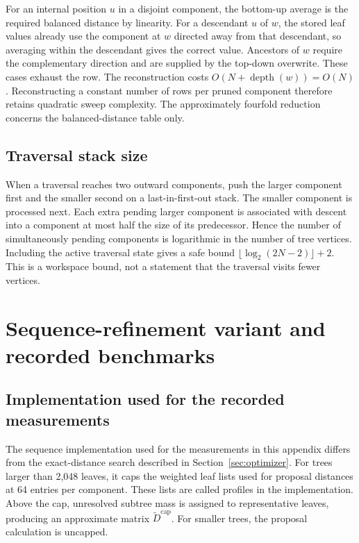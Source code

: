 For an internal position $u$ in a disjoint component, the bottom-up average is the required balanced distance by linearity.
For a descendant $u$ of $w$, the stored leaf values already use the component at $w$ directed away from that descendant, so averaging within the descendant gives the correct value.
Ancestors of $w$ require the complementary direction and are supplied by the top-down overwrite.
These cases exhaust the row.
The reconstruction costs $O(N+\operatorname{depth}(w))=O(N)$.
Reconstructing a constant number of rows per pruned component therefore retains quadratic sweep complexity.
The approximately fourfold reduction concerns the balanced-distance table only.

\subsection{Traversal stack size}

When a traversal reaches two outward components, push the larger component first and the smaller second on a last-in-first-out stack.
The smaller component is processed next.
Each extra pending larger component is associated with descent into a component at most half the size of its predecessor.
Hence the number of simultaneously pending components is logarithmic in the number of tree vertices.
Including the active traversal state gives a safe bound
$\lfloor\log_2(2N-2)\rfloor+2$.
This is a workspace bound, not a statement that the traversal visits fewer vertices.

\section{Sequence-refinement variant and recorded benchmarks}
\label{sec:sequence_variant}

\subsection{Implementation used for the recorded measurements}

The sequence implementation used for the measurements in this appendix differs from the exact-distance search described in Section~\ref{sec:optimizer}.
For trees larger than 2,048 leaves, it caps the weighted leaf lists used for proposal distances at 64 entries per component.
These lists are called profiles in the implementation.
Above the cap, unresolved subtree mass is assigned to representative leaves, producing an approximate matrix $\widetilde D^{\mathrm{cap}}$.
For smaller trees, the proposal calculation is uncapped.

